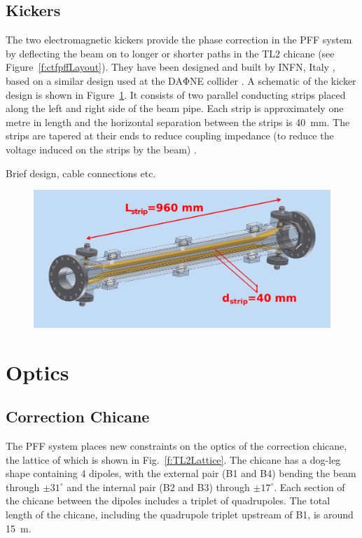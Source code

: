 \documentclass[%
 reprint,
 superscriptaddress,
 amsmath,
 amssymb,
 prstab,
]{revtex4-1}
\begin{document}
\subsection{\label{ss:kick}Kickers}

The two electromagnetic kickers provide the phase correction in the PFF system 
by deflecting the beam on to longer or shorter paths in the TL2 chicane (see 
Figure~\ref{f:ctfpffLayout}). They have been designed and built by INFN, Italy 
\cite{infn}, based on a similar design used at the DA\(\mathrm{\Phi}\)NE 
collider \cite{dafneKick}. A schematic of the kicker design is shown in 
Figure~\ref{f:kickerSchematic}. It consists of two parallel conducting strips 
placed along the left and right side of the beam pipe. Each strip is 
approximately one metre in length and the horizontal separation between the 
strips is 40~mm. The strips are tapered at their ends to reduce coupling 
impedance (to reduce the voltage induced on the strips by the beam) 
\cite{kickerIPAC11}.

Brief design, cable connections etc.

\begin{figure}
	\includegraphics[width=\columnwidth]{figs/hw/kickerSchematic}%
	\caption{\label{f:kickerSchematic}
	}
\end{figure}

\section{\label{s:optics}Optics}

\subsection{\label{ss:chicane}Correction Chicane}

The PFF system places new constraints on the optics of the correction chicane, 
the lattice of which is shown in Fig.~\ref{f:TL2Lattice}. The chicane has a 
dog-leg shape containing 
4 dipoles, with the external pair (B1 and B4) bending the beam through 
\(\pm31^\circ\) and 
the internal pair (B2 and B3) through \(\pm17^\circ\). Each section of the 
chicane between 
the dipoles includes a triplet of quadrupoles. The total length of the chicane, 
including the quadrupole triplet upstream of B1, is around 15~m.
\end{document}
